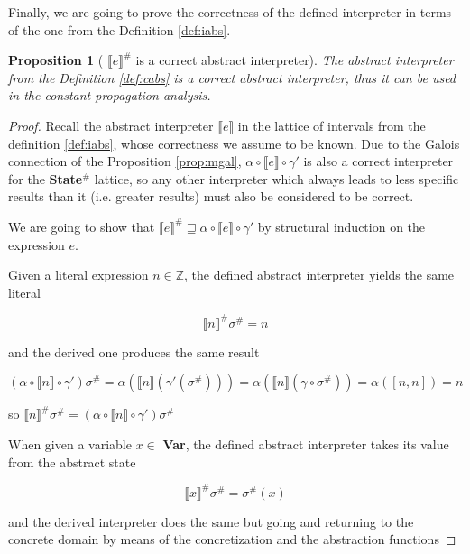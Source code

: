 \documentclass{article}
\newtheorem{proposition}{Proposition}
\begin{document}
Finally, we are going to prove the correctness of the defined 
interpreter in terms of the one from the Definition \ref{def:iabs}.

\begin{proposition}[
  $\llbracket e \rrbracket^\#$ is a correct abstract interpreter
]

The abstract interpreter from the Definition \ref{def:cabs} 
is a correct abstract interpreter, thus it can be used in the 
constant propagation analysis. 
\end{proposition}

\begin{proof}
  Recall the abstract interpreter $\llbracket e \rrbracket$ 
  in the lattice of intervals from the definition \ref{def:iabs},
  whose correctness we assume to be known. Due to the Galois 
  connection of the Proposition \ref{prop:mgal}, 
  $\alpha \circ \llbracket e \rrbracket \circ \gamma'$ is 
  also a correct interpreter for the \textbf{State$^\#$} 
  lattice, so any other interpreter which always leads to less 
  specific results than it (i.e. greater results) must also be 
  considered to be correct.
  
  We are going to show that $\llbracket e \rrbracket^\# 
  \sqsupseteq \alpha \circ \llbracket e \rrbracket \circ \gamma'$
  by structural induction on the expression $e$.

  Given a literal expression $n \in \mathbb{Z}$, the defined 
  abstract interpreter yields the same literal

  $$
    \llbracket n \rrbracket^\# \sigma^\# = n
  $$

  and the derived one produces the same result

  $$
    (\alpha \circ \llbracket n \rrbracket \circ \gamma') \sigma^\# = 
      \alpha (\llbracket n \rrbracket (\gamma' (\sigma^\#))) =
      \alpha (\llbracket n \rrbracket (\gamma \circ \sigma^\#)) =
      \alpha ([n, n]) = 
      n
  $$

  so $\llbracket n \rrbracket^\# \sigma^\# = 
  (\alpha \circ \llbracket n \rrbracket \circ \gamma') \sigma^\#$
  
  When given a variable $x \in$ \textbf{Var}, the defined
  abstract interpreter takes its value from the abstract 
  state

  $$
    \llbracket x \rrbracket^\# \sigma^\# = \sigma^\#(x)
  $$

  and the derived interpreter does the same but 
  going and returning to the concrete domain by means of 
  the concretization and the abstraction functions 


\end{proof}
\end{document}
